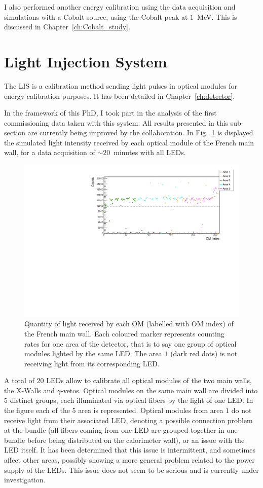 I also performed another energy calibration using the data acquisition and simulations with a Cobalt source, using the Cobalt peak at $1$~MeV.
This is discussed in Chapter~\ref{ch:Cobalt_study}.


\section{Light Injection System}
\label{sec:LI}

The LIS is a calibration method sending light pulses in optical modules for energy calibration purposes.
It has been detailed in Chapter~\ref{ch:detector}.

In the framework of this PhD, I took part in the analysis of the first commissioning data taken with this system.
All results presented in this sub-section are currently being improved by the collaboration.
In Fig.~\ref{fig:LI_counts} is displayed the simulated light intensity received by each optical module of the French main wall, for a data acquisition of $\sim20$~minutes with all LEDs.
\begin{figure}[h]
  \centering
  \includegraphics[width=15cm]{commissioning/fig_commissioning/LI_1d_counts.pdf}
  \caption{Quantity of light received by each OM (labelled with OM index) of the French main wall.
    Each coloured marker represents counting rates for one area of the detector, that is to say one group of optical modules lighted by the same LED.
    The area $1$ (dark red dots) is not receiving light from its corresponding LED.
    \label{fig:LI_counts}}
\end{figure}
A total of $20$ LEDs allow to calibrate all optical modules of the two main walls, the X-Walls and $\gamma$-vetos.
Optical modules on the same main wall are divided into $5$ distinct groups, each illuminated via optical fibers by the light of one LED.
In the figure each of the $5$ area is represented.
Optical modules from area $1$ do not receive light from their associated LED, denoting a possible connection problem at the bundle (all fibers coming from one LED are grouped together in one bundle before being distributed on the calorimeter wall), or an issue with the LED itself.
It has been determined that this issue is intermittent, and sometimes affect other areas, possibly showing a more general problem related to the power supply of the LEDs.
This issue does not seem to be serious and is currently under investigation.

